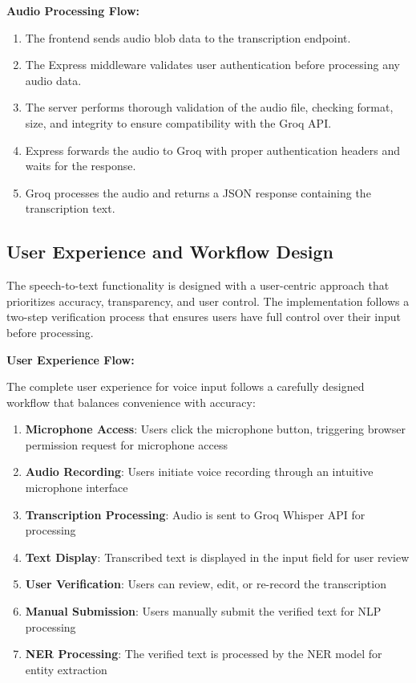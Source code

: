 \documentclass[12pt,a4paper]{article}
\begin{document}
\textbf{Audio Processing Flow:}
\begin{enumerate}
    \item The frontend sends audio blob data to the transcription endpoint.
    \item The Express middleware validates user authentication before processing any audio data.
    \item The server performs thorough validation of the audio file, checking format, size, and integrity to ensure compatibility with the Groq API.
    \item Express forwards the audio to Groq with proper authentication headers and waits for the response.
    \item Groq processes the audio and returns a JSON response containing the transcription text.
\end{enumerate}


\subsection{User Experience and Workflow Design}

The speech-to-text functionality is designed with a user-centric approach that prioritizes accuracy, transparency, and user control. The implementation follows a two-step verification process that ensures users have full control over their input before processing.

\textbf{User Experience Flow:}

The complete user experience for voice input follows a carefully designed workflow that balances convenience with accuracy:

\begin{enumerate}
    \item \textbf{Microphone Access}: Users click the microphone button, triggering browser permission request for microphone access
    \item \textbf{Audio Recording}: Users initiate voice recording through an intuitive microphone interface
    \item \textbf{Transcription Processing}: Audio is sent to Groq Whisper API for processing
    \item \textbf{Text Display}: Transcribed text is displayed in the input field for user review
    \item \textbf{User Verification}: Users can review, edit, or re-record the transcription
    \item \textbf{Manual Submission}: Users manually submit the verified text for NLP processing
    \item \textbf{NER Processing}: The verified text is processed by the NER model for entity extraction
\end{enumerate}
\end{document}

